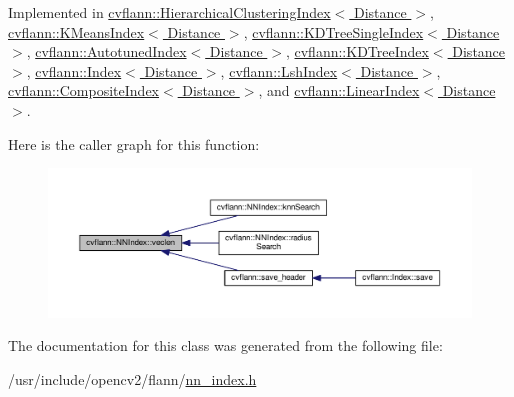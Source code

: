 Implemented in \hyperlink{classcvflann_1_1HierarchicalClusteringIndex_ad781ea5411f66fcb8f1d4dae9312498f}{cvflann\-::\-Hierarchical\-Clustering\-Index$<$ Distance $>$}, \hyperlink{classcvflann_1_1KMeansIndex_ad3c60e35d2f9face152ef9a8a303493a}{cvflann\-::\-K\-Means\-Index$<$ Distance $>$}, \hyperlink{classcvflann_1_1KDTreeSingleIndex_a4f9c5a8847c6b86b715606635669098e}{cvflann\-::\-K\-D\-Tree\-Single\-Index$<$ Distance $>$}, \hyperlink{classcvflann_1_1AutotunedIndex_aad8c5c2a8c18c86752840d7e1ff95cdc}{cvflann\-::\-Autotuned\-Index$<$ Distance $>$}, \hyperlink{classcvflann_1_1KDTreeIndex_a35ff8e5d4050cbbecbe0e878baba06de}{cvflann\-::\-K\-D\-Tree\-Index$<$ Distance $>$}, \hyperlink{classcvflann_1_1Index_a6b7474356bf2d43469d54eb98aabd5d8}{cvflann\-::\-Index$<$ Distance $>$}, \hyperlink{classcvflann_1_1LshIndex_acdd5815793d1584b45615cdf075b3580}{cvflann\-::\-Lsh\-Index$<$ Distance $>$}, \hyperlink{classcvflann_1_1CompositeIndex_a756ca64ccd989d3f3b7dd6f4d58c1fe3}{cvflann\-::\-Composite\-Index$<$ Distance $>$}, and \hyperlink{classcvflann_1_1LinearIndex_a9b9b92be1c7f4c7ce3574043da538c13}{cvflann\-::\-Linear\-Index$<$ Distance $>$}.



Here is the caller graph for this function\-:\nopagebreak
\begin{figure}[H]
\begin{center}
\leavevmode
\includegraphics[width=350pt]{classcvflann_1_1NNIndex_acdcc255d1b67d5636a0f76b68809e6be_icgraph}
\end{center}
\end{figure}




The documentation for this class was generated from the following file\-:\begin{DoxyCompactItemize}
\item 
/usr/include/opencv2/flann/\hyperlink{nn__index_8h}{nn\-\_\-index.\-h}\end{DoxyCompactItemize}

